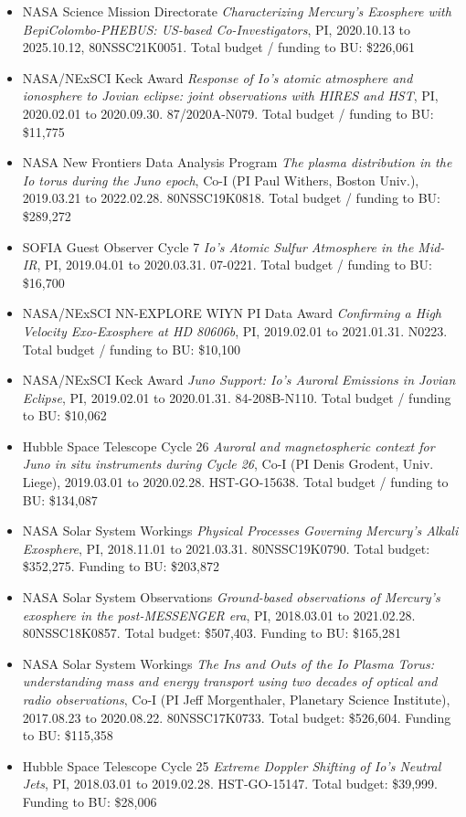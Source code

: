 \documentclass[12pt]{report}
\begin{document}
\begin{itemize}
 \item NASA Science Mission Directorate {\it Characterizing Mercury’s Exosphere with BepiColombo-PHEBUS: US-based Co-Investigators}, PI, 2020.10.13 to 2025.10.12, 80NSSC21K0051. Total budget / funding to BU: \$226,061
 \item NASA/NExSCI Keck Award {\it Response of Io's atomic atmosphere and ionosphere to Jovian eclipse: joint observations with HIRES and HST}, PI, 2020.02.01 to 2020.09.30. 87/2020A-N079. Total budget / funding to BU: \$11,775
 \item NASA New Frontiers Data Analysis Program {\it The plasma distribution in the Io torus during the Juno epoch}, Co-I (PI Paul Withers, Boston Univ.), 2019.03.21 to 2022.02.28. 80NSSC19K0818. Total budget / funding to BU: \$289,272
 \item SOFIA Guest Observer Cycle 7 {\it Io's Atomic Sulfur Atmosphere in the Mid-IR}, PI, 2019.04.01 to 2020.03.31. 07-0221. Total budget / funding to BU: \$16,700
 \item NASA/NExSCI NN-EXPLORE WIYN PI Data Award {\it Confirming a High Velocity Exo-Exosphere at HD 80606b}, PI, 2019.02.01 to 2021.01.31. N0223. Total budget / funding to BU: \$10,100
 \item NASA/NExSCI Keck Award {\it Juno Support: Io's Auroral Emissions in Jovian Eclipse}, PI, 2019.02.01 to 2020.01.31. 84-208B-N110. Total budget / funding to BU: \$10,062
 \item Hubble Space Telescope Cycle 26 {\it Auroral and magnetospheric context for Juno in situ instruments during Cycle 26}, Co-I (PI Denis Grodent, Univ. Liege), 2019.03.01 to 2020.02.28. HST-GO-15638. Total budget / funding to BU: \$134,087
 \item NASA Solar System Workings  {\it Physical Processes Governing Mercury's Alkali Exosphere}, PI, 2018.11.01 to 2021.03.31. 80NSSC19K0790. Total budget: \$352,275. Funding to BU: \$203,872
 \item NASA Solar System Observations {\it Ground-based observations of Mercury's exosphere in the post-MESSENGER era}, PI, 2018.03.01 to 2021.02.28. 80NSSC18K0857. Total budget: \$507,403. Funding to BU: \$165,281
 \item NASA Solar System Workings {\it The Ins and Outs of the Io Plasma Torus: understanding mass and energy transport using two decades of optical and radio observations}, Co-I (PI Jeff Morgenthaler, Planetary Science Institute), 2017.08.23 to 2020.08.22. 80NSSC17K0733. Total budget: \$526,604. Funding to BU: \$115,358
 \item Hubble Space Telescope Cycle 25 {\it Extreme Doppler Shifting of Io's Neutral Jets}, PI, 2018.03.01 to 2019.02.28. HST-GO-15147. Total budget: \$39,999. Funding to BU: \$28,006

\end{itemize}
\end{document}
